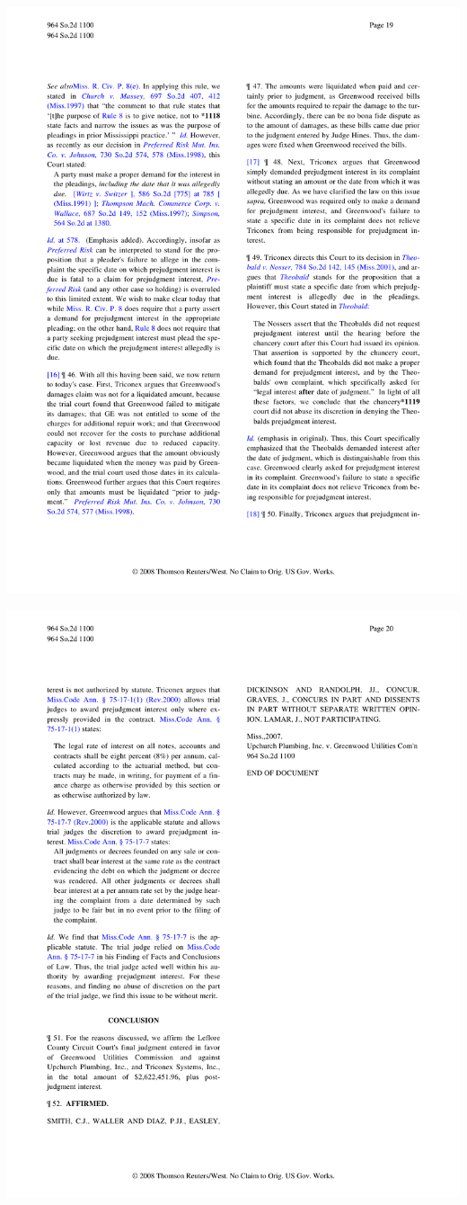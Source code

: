 \begin{center}\includegraphics[scale=0.95]{upchurch/upchurch19.pdf}\end{center}
\begin{center}\includegraphics[scale=0.95]{upchurch/upchurch20.pdf}\end{center}